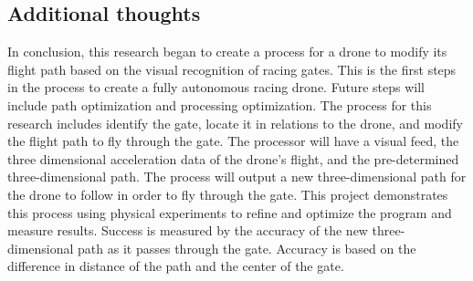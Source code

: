 \subsection{Additional thoughts}
In conclusion, this research began to create a process for a drone to modify its flight path based on the visual recognition of racing gates. This is the first steps in the process to create a fully autonomous racing drone. Future steps will include path optimization and processing optimization. The process for this research includes identify the gate, locate it in relations to the drone, and modify the flight path to fly through the gate. The processor will have a visual feed, the three dimensional acceleration data of the drone’s flight, and the pre-determined three-dimensional path. The process will output a new three-dimensional path for the drone to follow in order to fly through the gate. This project demonstrates this process using physical experiments to refine and optimize the program and measure results. Success is measured by the accuracy of the new three-dimensional path as it passes through the gate. Accuracy is based on the difference in distance of the path and the center of the gate. 

